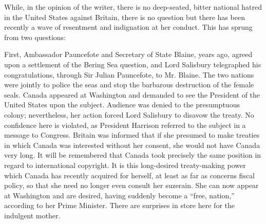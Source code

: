 \documentclass[11pt,openany]{book}
\begin{document}
While, in the opinion of the writer, there is no deep-seated, bitter national hatred in the United States against Britain, there is no question but there has been recently a wave of resentment and indignation at her conduct. This has sprung from two questions:

First, Ambassador Pauncefote and Secretary of State Blaine, years ago, agreed upon a settlement of the Bering Sea question, and Lord Salisbury telegraphed his congratulations, through Sir Julian Pauncefote, to Mr. Blaine. The two nations were jointly to police the seas and stop the barbarous destruction of the female seals. Canada appeared at Washington and demanded to see the President of the United States upon the subject. Audience was denied to the presumptuous colony; nevertheless, her action forced Lord Salisbury to disavow the treaty. No confidence here is violated, as President Harrison referred to the subject in a message to Congress. Britain was informed that if she presumed to make treaties in which Canada was interested without her consent, she would not have Canada very long. It will be remembered that Canada took precisely the same position in regard to international copyright. It is this long-desired treaty-making power which Canada has recently acquired for herself, at least as far as concerns fiscal policy, so that she need no longer even consult her suzerain. She can now appear at Washington and are desired, having suddenly become a ``free, nation,'' according to her Prime Minister. There are surprises in store here for the indulgent mother.
\end{document}
